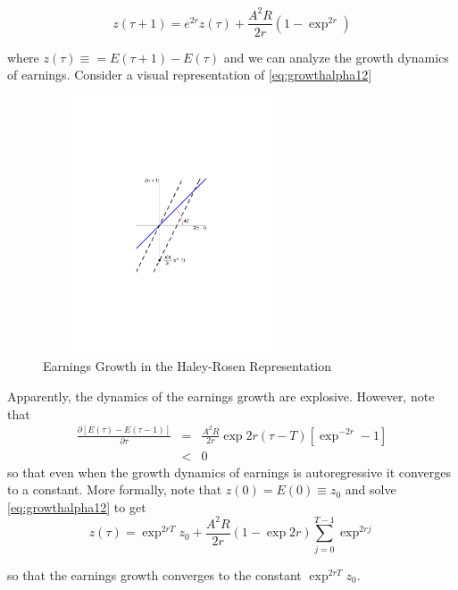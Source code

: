 \begin{equation}
z(\tau + 1) = e^{2r} z(\tau) + \frac{A^2 R}{2r} \left( 1 - \exp^{2r} \right) \label{eq:growthalpha12}
\end{equation}

\noindent where $z(\tau) \equiv = E(\tau + 1) - E(\tau)$ and we can analyze the growth dynamics of earnings. Consider a visual representation of \eqref{eq:growthalpha12}

\begin{center}
\begin{figure}[H]
\caption{Earnings Growth in the Haley-Rosen Representation}
\centering
\includegraphics[width=3in, height=3in]{Figures/fig-explode-converge.pdf}
\end{figure}
\end{center}

\indent Apparently, the dynamics of the earnings growth are explosive. However, note that
\begin{eqnarray}
\frac{\partial \left[ E(\tau) - E(\tau - 1) \right] }{\partial \tau} &=& \frac{A^2 R}{2r} \exp{2r(\tau - T)} \left[ \exp^{-2r} - 1 \right] \nonumber \\
&<& 0
\end{eqnarray}
so that even when the growth dynamics of earnings is autoregressive it converges to a constant. More formally, note that $z(0) = E(0) \equiv z_{0}$ and solve \eqref{eq:growthalpha12} to get
\begin{equation}
z(\tau) = \exp^{2rT} z_{0} + \frac{A^2 R}{2r} \left( 1 - \exp{2r} \right) \sum \limits _{j=0} ^{T-1} \exp^{2rj}
\end{equation}

\noindent so that the earnings growth converges to the constant $\exp^{2rT} z_{0}$.\\


